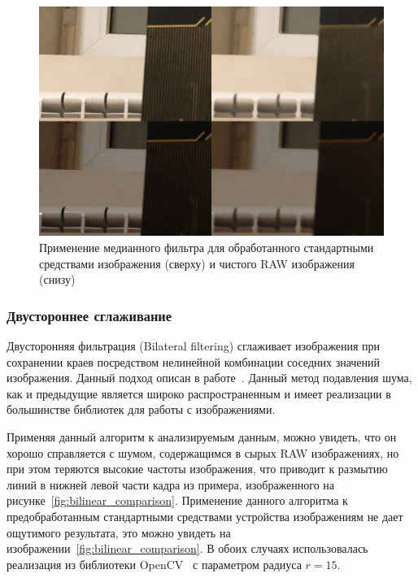 \documentclass[14pt]{mmcs_article}
\begin{document}
\begin{figure}[H]
	\centering
	\includegraphics[width=\textwidth]{img/medianfilter_comparison}
	\caption{Применение медианного фильтра для обработанного стандартными средствами изображения (сверху) и чистого RAW изображения (снизу)}
	\label{fig:medianblur_comparison}
\end{figure}

\subsubsection{Двустороннее сглаживание}
Двусторонняя фильтрация (Bilateral filtering) сглаживает изображения при сохранении краев посредством нелинейной комбинации соседних значений изображения. Данный подход описан в работе~\autocite{BilateralPaper}. Данный метод подавления шума, как и предыдущие является широко распространенным и имеет реализации в большинстве библиотек для работы с изображениями. 

Применяя данный алгоритм к анализируемым данным, можно увидеть, что он хорошо справляется с шумом, содержащимся в сырых RAW изображениях, но при этом теряются высокие частоты изображения, что приводит к размытию линий в нижней левой части кадра из примера, изображенного на рисунке~\ref{fig:bilinear_comparison}. Применение данного алгоритма к предобработанным стандартными средствами устройства изображениям не дает ощутимого результата, это можно увидеть на изображении~\ref{fig:bilinear_comparison}. В обоих случаях использовалась реализация из библиотеки OpenCV~\autocite{OpenCVLib} с параметром радиуса $r = 15$.
\end{document}
